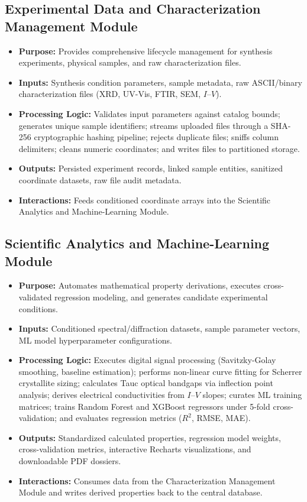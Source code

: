 \documentclass[12pt,a4paper,oneside]{report}
\begin{document}
{{{\subsection{Experimental Data and Characterization Management Module}

\begin{itemize}
    \item \textbf{Purpose:} Provides comprehensive lifecycle management for synthesis experiments, physical samples, and raw characterization files.
    \item \textbf{Inputs:} Synthesis condition parameters, sample metadata, raw ASCII/binary characterization files (XRD, UV-Vis, FTIR, SEM, $I\text{--}V$).
    \item \textbf{Processing Logic:} Validates input parameters against catalog bounds; generates unique sample identifiers; streams uploaded files through a SHA-256 cryptographic hashing pipeline; rejects duplicate files; sniffs column delimiters; cleans numeric coordinates; and writes files to partitioned storage.
    \item \textbf{Outputs:} Persisted experiment records, linked sample entities, sanitized coordinate datasets, raw file audit metadata.
    \item \textbf{Interactions:} Feeds conditioned coordinate arrays into the Scientific Analytics and Machine-Learning Module.
\end{itemize}

\subsection{Scientific Analytics and Machine-Learning Module}

\begin{itemize}
    \item \textbf{Purpose:} Automates mathematical property derivations, executes cross-validated regression modeling, and generates candidate experimental conditions.
    \item \textbf{Inputs:} Conditioned spectral/diffraction datasets, sample parameter vectors, ML model hyperparameter configurations.
    \item \textbf{Processing Logic:} Executes digital signal processing (Savitzky-Golay smoothing, baseline estimation); performs non-linear curve fitting for Scherrer crystallite sizing; calculates Tauc optical bandgaps via inflection point analysis; derives electrical conductivities from $I\text{--}V$ slopes; curates ML training matrices; trains Random Forest and XGBoost regressors under 5-fold cross-validation; and evaluates regression metrics ($R^2$, RMSE, MAE).
    \item \textbf{Outputs:} Standardized calculated properties, regression model weights, cross-validation metrics, interactive Recharts visualizations, and downloadable PDF dossiers.
    \item \textbf{Interactions:} Consumes data from the Characterization Management Module and writes derived properties back to the central database.
\end{itemize}

}}}
\end{document}
